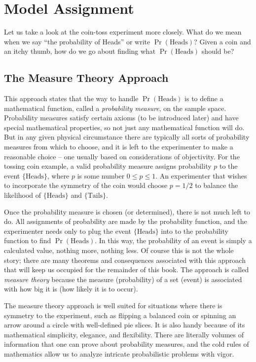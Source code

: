 \documentclass[captions=tableheading]{scrbook}
\begin{document}
\section{Model Assignment}
\label{sec-4-3}
\label{sec-Interpreting-Probabilities}


Let us take a look at the coin-toss experiment more closely. What do we mean when we say ``the probability of Heads'' or write \(\Pr(\mbox{Heads})\)? Given a coin and an itchy thumb, how do we go about finding what \(\Pr(\mbox{Heads})\) should be?
\subsection{The Measure Theory Approach}
\label{sec-4-3-1}


This approach states that the way to handle \(\Pr(\mbox{Heads})\) is to define a mathematical function, called a \emph{probability measure}, on the sample space. Probability measures satisfy certain axioms (to be introduced later) and have special mathematical properties, so not just any mathematical function will do. But in any given physical circumstance there are typically all sorts of probability measures from which to choose, and it is left to the experimenter to make a reasonable choice -- one usually based on considerations of objectivity. For the tossing coin example, a valid probability measure assigns probability \(p\) to the event \( \{ \mbox{Heads} \} \), where \(p\) is some number \(0\leq p\leq1\). An experimenter that wishes to incorporate the symmetry of the coin would choose \(p=1/2\) to balance the likelihood of \( \{\mbox{Heads} \} \) and \( \{ \mbox{Tails} \} \).

Once the probability measure is chosen (or determined), there is not much left to do. All assignments of probability are made by the probability function, and the experimenter needs only to plug the event \(\{ \mbox{Heads} \}\) into to the probability function to find \(\Pr(\mbox{Heads})\). In this way, the probability of an event is simply a calculated value, nothing more, nothing less. Of course this is not the whole story; there are many theorems and consequences associated with this approach that will keep us occupied for the remainder of this book. The approach is called \emph{measure theory} because the measure (probability) of a set (event) is associated with how big it is (how likely it is to occur).

The measure theory approach is well suited for situations where there is symmetry to the experiment, such as flipping a balanced coin or spinning an arrow around a circle with well-defined pie slices. It is also handy because of its mathematical simplicity, elegance, and flexibility. There are literally volumes of information that one can prove about probability measures, and the cold rules of mathematics allow us to analyze intricate probabilistic problems with vigor. 
\end{document}
